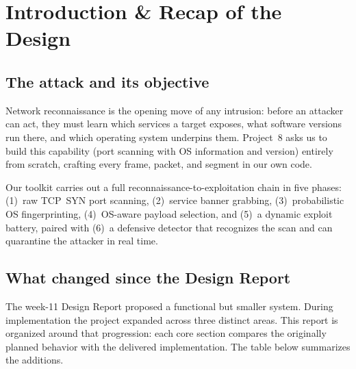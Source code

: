 \section{Introduction \& Recap of the Design}

\subsection{The attack and its objective}
Network reconnaissance is the opening move of any intrusion: before an attacker can act,
they must learn which services a target exposes, what software versions run there, and
which operating system underpins them. Project~8 asks us to build this capability
(port scanning with OS information and version) entirely from scratch, crafting every frame,
packet, and segment in our own code.

Our toolkit carries out a full reconnaissance-to-exploitation chain in five phases:
(1)~raw TCP~SYN port scanning, (2)~service banner grabbing, (3)~probabilistic OS
fingerprinting, (4)~OS-aware payload selection, and (5)~a dynamic exploit battery,
paired with (6)~a defensive detector that recognizes the scan and can quarantine the
attacker in real time.

\subsection{What changed since the Design Report}
The week-11 Design Report proposed a functional but smaller system. During
implementation the project expanded across three distinct areas.
This report is organized around that progression: each core section compares the
originally planned behavior with the delivered implementation. The table
below summarizes the additions.

